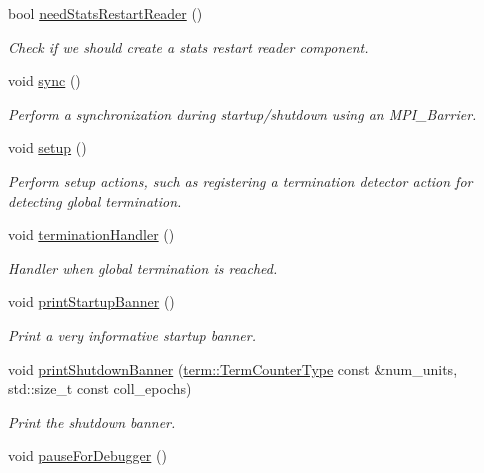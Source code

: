 \begin{DoxyCompactItemize}
bool \hyperlink{structvt_1_1runtime_1_1_runtime_a2c4ba18d500526776e4e0d1fcde215eb}{need\+Stats\+Restart\+Reader} ()
\begin{DoxyCompactList}\small\item\em Check if we should create a stats restart reader component. \end{DoxyCompactList}\item 
void \hyperlink{structvt_1_1runtime_1_1_runtime_a92fe07cb78904559dfc21de68018fb53}{sync} ()
\begin{DoxyCompactList}\small\item\em Perform a synchronization during startup/shutdown using an {\ttfamily M\+P\+I\+\_\+\+Barrier}. \end{DoxyCompactList}\item 
void \hyperlink{structvt_1_1runtime_1_1_runtime_a1c4fda11afb43bb2607cd1f00686550c}{setup} ()
\begin{DoxyCompactList}\small\item\em Perform setup actions, such as registering a termination detector action for detecting global termination. \end{DoxyCompactList}\item 
void \hyperlink{structvt_1_1runtime_1_1_runtime_a2d12f2a97d99585ef8e89cda0ed48972}{termination\+Handler} ()
\begin{DoxyCompactList}\small\item\em Handler when global termination is reached. \end{DoxyCompactList}\item 
void \hyperlink{structvt_1_1runtime_1_1_runtime_add9fabaf1c2f47ebf9c662f4b5f5931f}{print\+Startup\+Banner} ()
\begin{DoxyCompactList}\small\item\em Print a very informative startup banner. \end{DoxyCompactList}\item 
void \hyperlink{structvt_1_1runtime_1_1_runtime_a04efbdc6b8826e2c885987279a4762f1}{print\+Shutdown\+Banner} (\hyperlink{namespacevt_1_1term_a4fd378cdb0c36683afc1b3399d685f7f}{term\+::\+Term\+Counter\+Type} const \&num\+\_\+units, std\+::size\+\_\+t const coll\+\_\+epochs)
\begin{DoxyCompactList}\small\item\em Print the shutdown banner. \end{DoxyCompactList}\item 
void \hyperlink{structvt_1_1runtime_1_1_runtime_afb151608d12de9a50ce037d5e8896e99}{pause\+For\+Debugger} ()

\end{DoxyCompactItemize}
